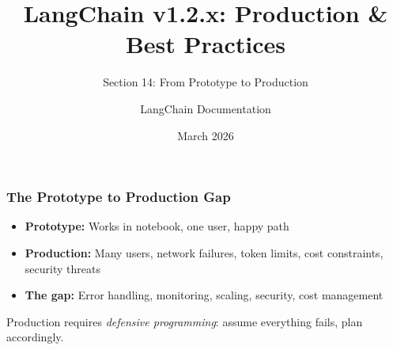 \documentclass[aspectratio=169,11pt]{beamer}
\title{LangChain v1.2.x: Production \& Best Practices}
\subtitle{Section 14: From Prototype to Production}
\author{LangChain Documentation}
\date{March 2026}
\begin{document}
\begin{frame}
\titlepage
\end{frame}

\begin{frame}
\frametitle{The Prototype to Production Gap}

\small
\begin{itemize}
  \setlength{\itemsep}{0pt}
  \item \textbf{Prototype:} Works in notebook, one user, happy path
  \item \textbf{Production:} Many users, network failures, token limits, cost constraints, security threats
  \item \textbf{The gap:} Error handling, monitoring, scaling, security, cost management
\end{itemize}

\vspace{1em}


\vspace{1em}

\begin{warningbox}
  \small Production requires \emph{defensive programming}: assume everything fails, plan accordingly.
\end{warningbox}

\end{frame}
\end{document}
